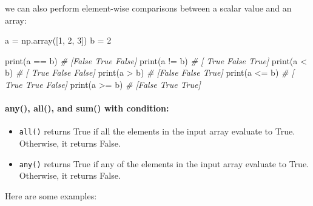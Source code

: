 \documentclass[11pt]{article}
\newenvironment{Shaded}{}{}
\newcommand{\DecValTok}[1]{\textcolor[rgb]{0.25,0.63,0.44}{{#1}}}
\newcommand{\CommentTok}[1]{\textcolor[rgb]{0.38,0.63,0.69}{\textit{{#1}}}}
\newcommand{\NormalTok}[1]{{#1}}
\newcommand{\OperatorTok}[1]{\textcolor[rgb]{0.40,0.40,0.40}{{#1}}}
\newcommand{\BuiltInTok}[1]{{#1}}
\begin{document}
we can also perform element-wise comparisons between a scalar value and
an array:

\begin{Shaded}
\begin{Highlighting}[]
\NormalTok{a }\OperatorTok{=}\NormalTok{ np.array([}\DecValTok{1}\NormalTok{, }\DecValTok{2}\NormalTok{, }\DecValTok{3}\NormalTok{])}
\NormalTok{b }\OperatorTok{=} \DecValTok{2}

\BuiltInTok{print}\NormalTok{(a }\OperatorTok{==}\NormalTok{ b)  }\CommentTok{\# [False  True False]}
\BuiltInTok{print}\NormalTok{(a }\OperatorTok{!=}\NormalTok{ b)  }\CommentTok{\# [ True False  True]}
\BuiltInTok{print}\NormalTok{(a }\OperatorTok{\textless{}}\NormalTok{ b)   }\CommentTok{\# [ True False False]}
\BuiltInTok{print}\NormalTok{(a }\OperatorTok{\textgreater{}}\NormalTok{ b)   }\CommentTok{\# [False False  True]}
\BuiltInTok{print}\NormalTok{(a }\OperatorTok{\textless{}=}\NormalTok{ b)  }\CommentTok{\# [ True  True False]}
\BuiltInTok{print}\NormalTok{(a }\OperatorTok{\textgreater{}=}\NormalTok{ b)  }\CommentTok{\# [False  True  True]}
\end{Highlighting}
\end{Shaded}

\hypertarget{any-all-and-sum-with-condition}{%
\paragraph{any(), all(), and sum() with
condition:}\label{any-all-and-sum-with-condition}}

\begin{itemize}
\item
  \texttt{all()} returns True if all the elements in the input array
  evaluate to True. Otherwise, it returns False.
\item
  \texttt{any()} returns True if any of the elements in the input array
  evaluate to True. Otherwise, it returns False.
\end{itemize}

Here are some examples:
\end{document}
